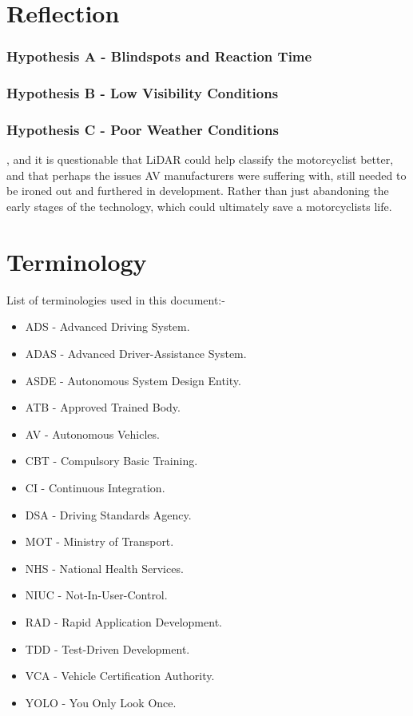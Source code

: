 \documentclass[12pt]{report} %
\begin{document}
\chapter{Reflection}
	\subsection*{Hypothesis A - Blindspots and Reaction Time}
	
	\subsection*{Hypothesis B - Low Visibility Conditions}

	\subsection*{Hypothesis C - Poor Weather Conditions}

	, and it is questionable that LiDAR could help classify the motorcyclist better, and that perhaps the issues AV manufacturers were suffering with, still needed to be ironed out and furthered in development. Rather than just abandoning the early stages of the technology, which could ultimately save a motorcyclists life.

\chapter*{Terminology}
List of terminologies used in this document:-
\begin{itemize}
	\item ADS - Advanced Driving System. 
	\item ADAS - Advanced Driver-Assistance System.
	\item ASDE - Autonomous System Design Entity.
	\item ATB - Approved Trained Body.
	\item AV - Autonomous Vehicles.
	\item CBT - Compulsory Basic Training.
	\item CI - Continuous Integration.
	\item DSA - Driving Standards Agency.
	\item MOT - Ministry of Transport.
	\item NHS - National Health Services.
	\item NIUC - Not-In-User-Control.
	\item RAD - Rapid Application Development.
	\item TDD - Test-Driven Development.
	\item VCA - Vehicle Certification Authority.
	\item YOLO - You Only Look Once.
\end{itemize}
  
\end{document}

